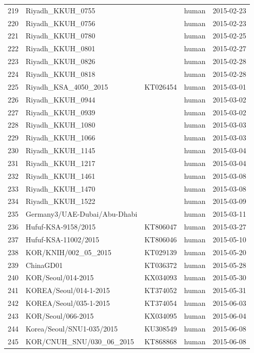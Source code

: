 \documentclass[11pt,oneside,letterpaper]{article}
\begin{document}
\begin{longtable}{ | l | l | l | l | l | }
  219 & Riyadh\_KKUH\_0755 &  & human & 2015-02-23 \\
  220 & Riyadh\_KKUH\_0756 &  & human & 2015-02-23 \\
  221 & Riyadh\_KKUH\_0780 &  & human & 2015-02-25 \\
  222 & Riyadh\_KKUH\_0801 &  & human & 2015-02-27 \\
  223 & Riyadh\_KKUH\_0826 &  & human & 2015-02-28 \\
  224 & Riyadh\_KKUH\_0818 &  & human & 2015-02-28 \\
  225 & Riyadh\_KSA\_4050\_2015 & KT026454 & human & 2015-03-01 \\
  226 & Riyadh\_KKUH\_0944 &  & human & 2015-03-02 \\
  227 & Riyadh\_KKUH\_0939 &  & human & 2015-03-02 \\
  228 & Riyadh\_KKUH\_1080 &  & human & 2015-03-03 \\
  229 & Riyadh\_KKUH\_1066 &  & human & 2015-03-03 \\
  230 & Riyadh\_KKUH\_1145 &  & human & 2015-03-04 \\
  231 & Riyadh\_KKUH\_1217 &  & human & 2015-03-04 \\
  232 & Riyadh\_KKUH\_1461 &  & human & 2015-03-08 \\
  233 & Riyadh\_KKUH\_1470 &  & human & 2015-03-08 \\
  234 & Riyadh\_KKUH\_1522 &  & human & 2015-03-09 \\
  235 & Germany3/UAE-Dubai/Abu-Dhabi &  & human & 2015-03-11 \\
  236 & Hufuf-KSA-9158/2015 & KT806047 & human & 2015-03-27 \\
  237 & Hufuf-KSA-11002/2015 & KT806046 & human & 2015-05-10 \\
  238 & KOR/KNIH/002\_05\_2015 & KT029139 & human & 2015-05-20 \\
  239 & ChinaGD01 & KT036372 & human & 2015-05-28 \\
  240 & KOR/Seoul/014-2015 & KX034093 & human & 2015-05-30 \\
  241 & KOREA/Seoul/014-1-2015 & KT374052 & human & 2015-05-31 \\
  242 & KOREA/Seoul/035-1-2015 & KT374054 & human & 2015-06-03 \\
  243 & KOR/Seoul/066-2015 & KX034095 & human & 2015-06-04 \\
  244 & Korea/Seoul/SNU1-035/2015 & KU308549 & human & 2015-06-08 \\
  245 & KOR/CNUH\_SNU/030\_06\_2015 & KT868868 & human & 2015-06-08 \\

\end{longtable}
\end{document}

